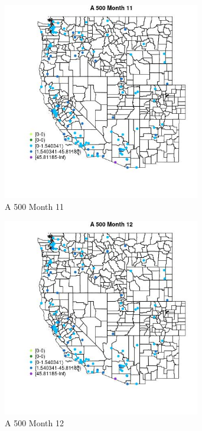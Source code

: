 \begin{figure} 
\centering  
\includegraphics[width=0.77\textwidth]{Code_Outputs/Report_ML_input_PM25_Step4_part_e_de_duplicated_aves_MapObsMo11A_500.jpg} 
\caption{\label{fig:Report_ML_input_PM25_Step4_part_e_de_duplicated_avesMapObsMo11A_500}A 500 Month 11} 
\end{figure} 
 

\begin{figure} 
\centering  
\includegraphics[width=0.77\textwidth]{Code_Outputs/Report_ML_input_PM25_Step4_part_e_de_duplicated_aves_MapObsMo12A_500.jpg} 
\caption{\label{fig:Report_ML_input_PM25_Step4_part_e_de_duplicated_avesMapObsMo12A_500}A 500 Month 12} 
\end{figure} 
 

